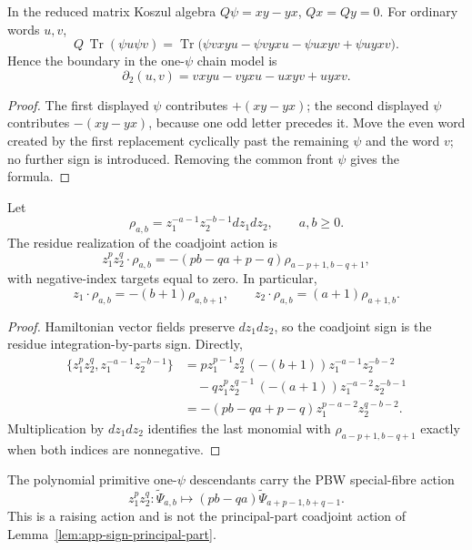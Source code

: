 \begin{lem}
\label{lem:app-sign-one-psi-boundary}
  In the reduced matrix Koszul algebra \(Q\psi=xy-yx\),
  \(Qx=Qy=0\).  For ordinary words \(u,v\),
  \[
    Q\,\operatorname{Tr}(\psi u\psi v)
      =
      \operatorname{Tr}\bigl(\psi vxyu-\psi vyxu-\psi uxyv+\psi uyxv\bigr).
  \]
  Hence the boundary in the one-\(\psi\) chain model is
  \[
    \partial_2(u,v)=vxyu-vyxu-uxyv+uyxv.
  \]
\end{lem}

\begin{proof}
  The first displayed \(\psi\) contributes \(+(xy-yx)\); the second
  displayed \(\psi\) contributes \(-(xy-yx)\), because one odd letter
  precedes it.  Move the even word created by the first replacement
  cyclically past the remaining \(\psi\) and the word \(v\); no further
  sign is introduced.  Removing the common front \(\psi\) gives the
  formula.
\end{proof}

\begin{lem}
\label{lem:app-sign-principal-part}
  Let
  \[
    \rho_{a,b}=z_1^{-a-1}z_2^{-b-1}dz_1dz_2,\qquad a,b\ge0.
  \]
  The residue realization of the coadjoint action is
  \[
    z_1^pz_2^q\cdot\rho_{a,b}
      =-(pb-qa+p-q)\rho_{a-p+1,b-q+1},
  \]
  with negative-index targets equal to zero.  In particular,
  \[
    z_1\cdot\rho_{a,b}=-(b+1)\rho_{a,b+1},\qquad
    z_2\cdot\rho_{a,b}=(a+1)\rho_{a+1,b}.
  \]
\end{lem}

\begin{proof}
  Hamiltonian vector fields preserve \(dz_1dz_2\), so the coadjoint sign
  is the residue integration-by-parts sign.  Directly,
  \[
  \begin{aligned}
    \{z_1^pz_2^q,z_1^{-a-1}z_2^{-b-1}\}
      &=
      pz_1^{p-1}z_2^q\, (-(b+1))z_1^{-a-1}z_2^{-b-2} \\
      &\quad
      -qz_1^pz_2^{q-1}\, (-(a+1))z_1^{-a-2}z_2^{-b-1} \\
      &=-(pb-qa+p-q)z_1^{p-a-2}z_2^{q-b-2}.
  \end{aligned}
  \]
  Multiplication by \(dz_1dz_2\) identifies the last monomial with
  \(\rho_{a-p+1,b-q+1}\) exactly when both indices are nonnegative.
\end{proof}

\begin{lem}
\label{lem:app-sign-pbw-descendant}
  The polynomial primitive one-\(\psi\) descendants carry the PBW
  special-fibre action
  \[
    z_1^pz_2^q:\widetilde\Psi_{a,b}
      \longmapsto
      (pb-qa)\widetilde\Psi_{a+p-1,b+q-1}.
  \]
  This is a raising action and is not the principal-part coadjoint action
  of Lemma~\ref{lem:app-sign-principal-part}.
\end{lem}

